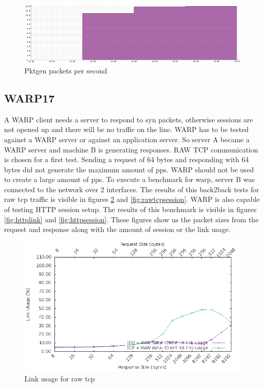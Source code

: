 \begin{figure}
  \includegraphics[scale=0.35]{images/pktgen_pps.png}
  \caption{Pktgen packets per second}
  \label{fig:pktgenpps}
\end{figure}


\subsection{WARP17}
A WARP client needs a server to respond to syn packets, otherwise sessions are not opened up and there will be no traffic on the line. 
WARP has to be tested against a WARP server or against an application server. 
So server A became a WARP server and machine B is generating responses. RAW TCP communication is chosen for a first test. Sending a request of 64 bytes and responding with 64 bytes did not generate the maximum amount of pps. WARP should not be used to create a large amount of pps. 
To execute a benchmark for warp, server B was connected to the network over 2 interfaces. 
The results of this back2back tests for raw tcp traffic is visible in figures \ref{fig:rawtcplink} and \ref{fig:rawtcpsession}. 
WARP is also capable of testing HTTP session setup. The results of this benchmark is visible in figures \ref{fig:httplink} and \ref{fig:httpsession}.
These figures show us the packet sizes from the request and response along with the amount of session or the link usage.

\begin{figure}
  \includegraphics[scale=0.6]{images/raw_link_usage.png}
  \caption{Link usage for raw tcp}
  \label{fig:rawtcplink}
\end{figure}

